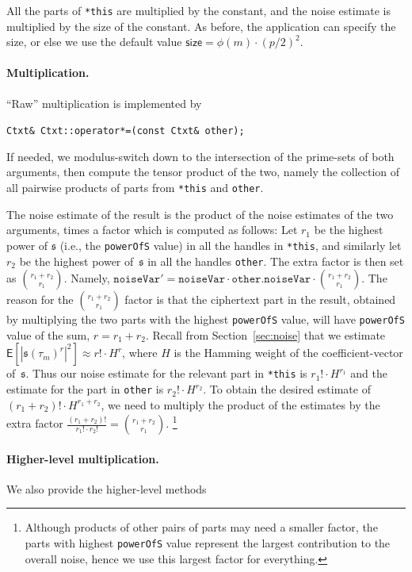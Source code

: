 \documentclass[14pt]{extarticle}
\newcommand{\secref}[1]{Section~\protect\ref{sec:#1}}
\def\EXP{\mathsf{E}}
\newcommand{\sk}{\mathfrak{s}}
\begin{document}
\noindent
All the parts of \texttt{*this} are multiplied by the constant, and
the noise estimate is multiplied by the size of the constant. As before,
the application can specify the size, or else we use the default value
$\mathsf{size}=\phi(m)\cdot(p/2)^2$.


\paragraph{Multiplication.} ``Raw'' multiplication is implemented by

  \texttt{Ctxt\& Ctxt::operator*=(const Ctxt\& other);}

\noindent
If needed, we modulus-switch down to the intersection of the prime-sets
of both arguments, then compute the tensor product of the two, namely
the collection of all pairwise products of parts from \texttt{*this}
and \texttt{other}. 

The noise estimate of the result is the product of the noise estimates
of the two arguments, times a factor which is computed as follows: Let
$r_1$ be the highest power of $\sk$ (i.e., the \texttt{powerOfS} value)
in all the handles in \texttt{*this}, and similarly let $r_2$ be the
highest power of~$\sk$ in all the handles \texttt{other}. The extra
factor is then set as ${r_1+r_2}\choose{r_1}$. Namely,
$\mathtt{noiseVar}'= \mathtt{noiseVar}\cdot\mathtt{other.noiseVar}
\cdot{{r_1+r_2}\choose{r_1}}$.
The reason for the ${r_1+r_2}\choose{r_1}$ factor is that the
ciphertext part in the result, obtained by multiplying the two parts
with the highest \texttt{powerOfS} value, will have \texttt{powerOfS}
value of the sum, $r=r_1+r_2$. Recall from \secref{noise} that we
estimate $\EXP[\left|\sk(\tau_m)^r\right|^2] \approx r!\cdot H^r$,
where $H$ is the Hamming weight of the coefficient-vector of~$\sk$.
Thus our noise estimate for the relevant part in \texttt{*this} is
$r_1!\cdot H^{r_1}$ and the estimate for the part in \texttt{other}
is $r_2!\cdot H^{r_2}$. To obtain the desired estimate of 
$(r_1+r_2)!\cdot H^{r_1+r_2}$, we need to multiply the product of
the estimates by the extra factor $\frac{(r_1+r_2)!}{r_1!\cdot r_2!}=
{{r_1+r_2}\choose{r_1}}$.
\footnote{Although products of other pairs of parts may need a smaller
  factor, the parts with highest \texttt{powerOfS} value represent the
  largest contribution to the overall noise, hence we use this largest
  factor for everything.}\ 

\paragraph{Higher-level multiplication.}
We also provide the higher-level methods
\end{document}
